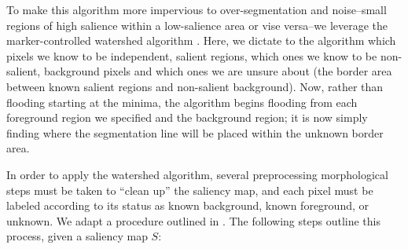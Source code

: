 To make this algorithm more impervious to over-segmentation and noise--small regions of high salience within a low-salience area or vise versa--we leverage the marker-controlled watershed algorithm \cite{roerdink2000watershed}. Here, we dictate to the algorithm which pixels we know to be independent, salient regions, which ones we know to be non-salient, background pixels and which ones we are unsure about (the border area between known salient regions and non-salient background). Now, rather than flooding starting at the minima, the algorithm begins flooding from each foreground region we specified and the background region; it is now simply finding where the segmentation line will be placed within the unknown border area.

In order to apply the watershed algorithm, several preprocessing morphological steps must be taken to “clean up” the saliency map, and each pixel must be labeled according to its status as known background, known foreground, or unknown. We adapt a procedure outlined in \cite{opencv_2017}. The following steps outline this process, given a saliency map $S$:

